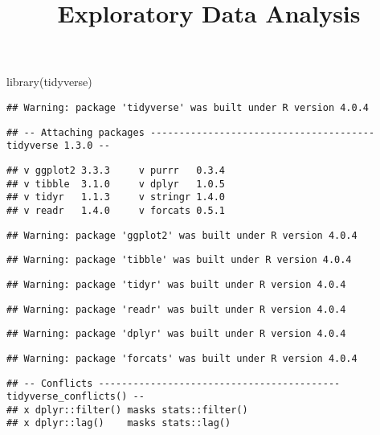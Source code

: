 \documentclass[
]{article}
\title{Exploratory Data Analysis}
\author{}
\date{\vspace{-2.5em}}
\newenvironment{Shaded}{\begin{snugshade}}{\end{snugshade}}
\newcommand{\FunctionTok}[1]{\textcolor[rgb]{0.00,0.00,0.00}{#1}}
\newcommand{\NormalTok}[1]{#1}
\begin{document}
\maketitle

\begin{Shaded}
\begin{Highlighting}[]
\FunctionTok{library}\NormalTok{(tidyverse)}
\end{Highlighting}
\end{Shaded}

\begin{verbatim}
## Warning: package 'tidyverse' was built under R version 4.0.4
\end{verbatim}

\begin{verbatim}
## -- Attaching packages --------------------------------------- tidyverse 1.3.0 --
\end{verbatim}

\begin{verbatim}
## v ggplot2 3.3.3     v purrr   0.3.4
## v tibble  3.1.0     v dplyr   1.0.5
## v tidyr   1.1.3     v stringr 1.4.0
## v readr   1.4.0     v forcats 0.5.1
\end{verbatim}

\begin{verbatim}
## Warning: package 'ggplot2' was built under R version 4.0.4
\end{verbatim}

\begin{verbatim}
## Warning: package 'tibble' was built under R version 4.0.4
\end{verbatim}

\begin{verbatim}
## Warning: package 'tidyr' was built under R version 4.0.4
\end{verbatim}

\begin{verbatim}
## Warning: package 'readr' was built under R version 4.0.4
\end{verbatim}

\begin{verbatim}
## Warning: package 'dplyr' was built under R version 4.0.4
\end{verbatim}

\begin{verbatim}
## Warning: package 'forcats' was built under R version 4.0.4
\end{verbatim}

\begin{verbatim}
## -- Conflicts ------------------------------------------ tidyverse_conflicts() --
## x dplyr::filter() masks stats::filter()
## x dplyr::lag()    masks stats::lag()
\end{verbatim}
\end{document}
